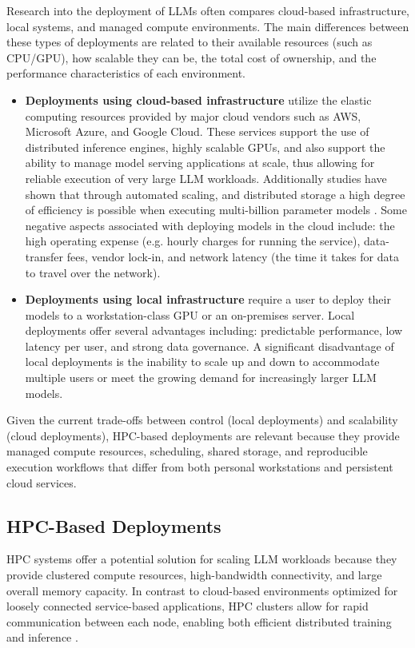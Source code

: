 Research into the deployment of \acp{LLM} often compares cloud-based infrastructure, local systems, and managed compute environments. The main differences between these types of deployments are related to their available resources (such as CPU/GPU), how scalable they can be, the total cost of ownership, and the performance characteristics of each environment.
\begin{itemize}
    \item \textbf{Deployments using cloud-based infrastructure} utilize the elastic computing resources provided by major cloud vendors such as \acf{AWS}, Microsoft Azure, and Google Cloud. These services support the use of distributed inference engines, highly scalable \acp{GPU}, and also support the ability to manage model serving applications at scale, thus allowing for reliable execution of very large \ac{LLM} workloads. Additionally studies have shown that through automated scaling, and distributed storage a high degree of efficiency is possible when executing multi-billion parameter models \cite{narayanan2021cloudscale}. Some negative aspects associated with deploying models in the cloud include: the high operating expense (e.g. hourly charges for running the service), data-transfer fees, vendor lock-in, and network latency (the time it takes for data to travel over the network).
    \item \textbf{Deployments using local infrastructure} require a user to deploy their models to a workstation-class \ac{GPU} or an on-premises server. Local deployments offer several advantages including: predictable performance, low latency per user, and strong data governance. A significant disadvantage of local deployments is the inability to scale up and down to accommodate multiple users or meet the growing demand for increasingly larger \ac{LLM} models.
\end{itemize}

Given the current trade-offs between control (local deployments) and scalability (cloud deployments), \ac{HPC}-based deployments are relevant because they provide managed compute resources, scheduling, shared storage, and reproducible execution workflows that differ from both personal workstations and persistent cloud services.

\subsection{HPC-Based Deployments}

\acf{HPC} systems offer a potential solution for scaling \ac{LLM} workloads because they provide clustered compute resources, high-bandwidth connectivity, and large overall memory capacity. In contrast to cloud-based environments optimized for loosely connected service-based applications, \ac{HPC} clusters allow for rapid communication between each node, enabling both efficient distributed training and inference \cite{dongarra2020hpcsurvey}.

